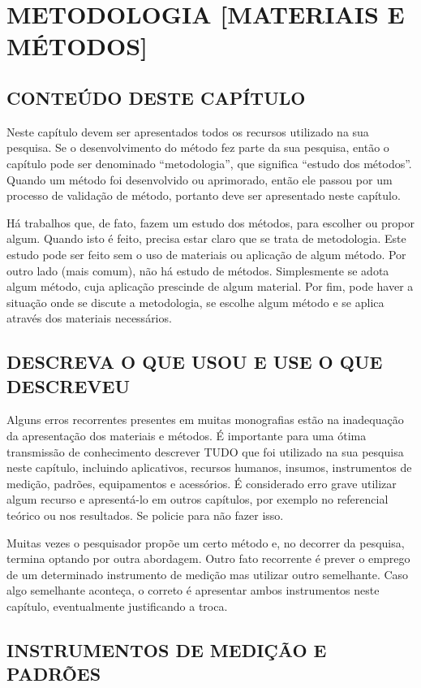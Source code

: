 \chapter{METODOLOGIA [MATERIAIS E MÉTODOS]}
\section{CONTEÚDO DESTE CAPÍTULO}
Neste capítulo devem ser apresentados todos os recursos utilizado na sua pesquisa. Se o desenvolvimento do método fez parte da sua pesquisa, então o capítulo pode ser denominado “metodologia”, que significa “estudo dos métodos”. Quando um método foi desenvolvido ou aprimorado, então ele passou por um processo de validação de método, portanto deve ser apresentado neste capítulo.

Há trabalhos que, de fato, fazem um estudo dos métodos, para escolher ou propor algum. Quando isto é feito, precisa estar claro que se trata de metodologia. Este estudo pode ser feito sem o uso de materiais ou aplicação de algum método. Por outro lado (mais comum), não há estudo de métodos. Simplesmente se adota algum método, cuja aplicação prescinde de algum material. Por fim, pode haver a situação onde se discute a metodologia, se escolhe algum método e se aplica através dos materiais necessários.

\section{DESCREVA O QUE USOU E USE O QUE DESCREVEU}
Alguns erros recorrentes presentes em muitas monografias estão na inadequação da apresentação dos materiais e métodos. É importante para uma ótima transmissão de conhecimento descrever TUDO que foi utilizado na sua pesquisa neste capítulo, incluindo aplicativos, recursos humanos, insumos, instrumentos de medição, padrões, equipamentos e acessórios. É considerado erro grave utilizar algum recurso e apresentá-lo em outros capítulos, por exemplo no referencial teórico ou nos resultados. Se policie para não fazer isso.

Muitas vezes o pesquisador propõe um certo método e, no decorrer da pesquisa, termina optando por outra abordagem. Outro fato recorrente é prever o emprego de um determinado instrumento de medição mas utilizar outro semelhante. Caso algo semelhante aconteça, o correto é apresentar ambos instrumentos neste capítulo, eventualmente justificando a troca.

\section{INSTRUMENTOS DE MEDIÇÃO E PADRÕES}

